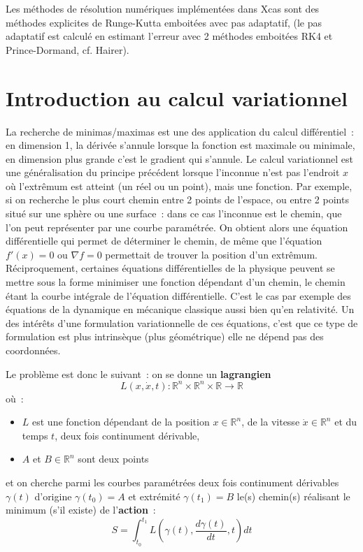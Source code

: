 \documentclass[a4paper,11pt]{article}
\newcommand{\R}{{\mathbb{R}}}
\begin{document}
Les méthodes de résolution numériques implémentées dans Xcas sont
des méthodes explicites de Runge-Kutta emboitées avec pas adaptatif, 
(le pas adaptatif est calcul\'e en estimant l'erreur 
avec 2 méthodes emboitées RK4 et
Prince-Dormand, cf. Hairer).


\section{Introduction au calcul variationnel} \label{sec:lagrangien}
La recherche de minimas/maximas est une des application 
du calcul diff\'erentiel~: en dimension 1, la d\'eriv\'ee s'annule
lorsque la fonction est maximale ou minimale, en dimension plus
grande c'est le gradient qui s'annule. Le calcul variationnel
est une g\'en\'eralisation du principe pr\'ec\'edent lorsque
l'inconnue n'est pas l'endroit $x$ o\`u l'extr\^emum est atteint
(un r\'eel ou un point), mais une fonction. Par exemple, si on recherche
le plus court chemin entre 2 points de l'espace, ou entre 2 points
situ\'e sur une sph\`ere ou une surface~: dans ce cas l'inconnue
est le chemin, que l'on peut repr\'esenter par une courbe 
param\'etr\'ee. On obtient alors une \'equation diff\'erentielle
qui permet de d\'eterminer le chemin, de m\^eme que l'\'equation
$f'(x)=0$ ou $\nabla f=0$ permettait de trouver la position
d'un extr\^emum. R\'eciproquement, certaines \'equations
diff\'erentielles de la physique peuvent se mettre sous la forme minimiser une
fonction d\'ependant d'un chemin, le chemin \'etant la courbe
int\'egrale de l'\'equation diff\'erentielle. C'est le cas par
exemple des \'equations de la dynamique en m\'ecanique
classique aussi bien qu'en relativit\'e. Un des int\'er\^ets d'une
formulation variationnelle de ces \'equations, c'est que ce type
de formulation est plus intrins\`eque (plus g\'eom\'etrique) 
elle ne d\'epend pas des coordonn\'ees.

Le probl\`eme est donc le suivant~: on se donne un 
{\bf lagrangien}
$$L(x,\dot{x},t): \R^n \times \R^n \times \R \rightarrow \R$$ 
o\`u~:
\begin{itemize}
\item $L$ est une fonction d\'ependant de la position $x \in \R^n$,
de la vitesse $\dot{x} \in \R^n$ et du temps $t$,
deux fois continument d\'erivable,
\item $A$ et $B \in \R^n$ sont deux points
\end{itemize}
et on cherche parmi les courbes param\'etr\'ees
deux fois continument d\'erivables
$\gamma(t)$ d'origine $\gamma(t_0)=A$ 
et extr\'emit\'e $\gamma(t_1)=B$ le(s) chemin(s) r\'ealisant le
minimum (s'il existe) de l'{\bf action}~:
$$ S=\int_{t_0}^{t_1} L(\gamma(t),\frac{d\gamma(t)}{dt},t) dt $$
\end{document}
